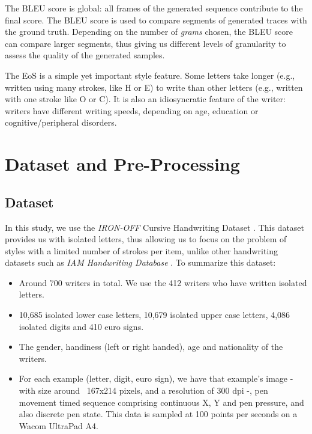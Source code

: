 \documentclass[conference]{IEEEtran}
\begin{document}
\par The BLEU score is global: all frames of the generated sequence contribute to the final score. The BLEU score is used to compare segments of generated traces with the ground truth. Depending on the number of \textit{grams} chosen, the BLEU score can compare larger segments, thus giving us different levels of granularity to assess the quality of the generated samples.


\par The EoS is a simple yet important style feature. Some letters take longer (e.g., written using many strokes, like H or E) to write than other letters (e.g., written with one stroke like O or C). It is also an idiosyncratic feature of the writer: writers have different writing speeds, depending on age, education or cognitive/peripheral disorders.

\section{Dataset and Pre-Processing}
\subsection{Dataset} \label{sec:data}
\par In this study, we use the \textit{IRON-OFF} Cursive Handwriting Dataset \cite{791823}. This dataset provides us with isolated letters, thus allowing us to focus on the problem of styles with a limited number of strokes per item, unlike other handwriting datasets such as \textit{IAM Handwriting Database} \cite{marti1999full}. To summarize this dataset:

\begin{itemize}
    \item Around 700 writers in total. We use the 412 writers who have written isolated letters.
    \item 10,685 isolated lower case letters, 10,679 isolated upper case letters, 4,086 isolated digits and 410 euro signs.
    \item The gender, handiness (left or right handed), age and nationality of the writers.
    \item For each example (letter, digit, euro sign), we have that example's image - with size around ~167x214 pixels, and a resolution of 300 dpi -, pen movement timed sequence comprising continuous X, Y and pen pressure, and also discrete pen state. This data is sampled at 100 points per seconds on a Wacom UltraPad A4. 
\end{itemize}
\end{document}
